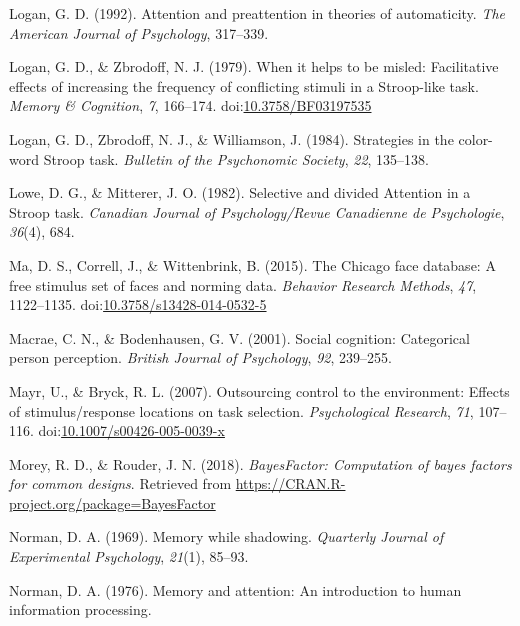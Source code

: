 \documentclass[english,,man,floatsintext]{apa6}
\begin{document}
\leavevmode\hypertarget{ref-logan_attention_1992}{}%
Logan, G. D. (1992). Attention and preattention in theories of automaticity. \emph{The American Journal of Psychology}, 317--339.

\leavevmode\hypertarget{ref-logan_when_1979}{}%
Logan, G. D., \& Zbrodoff, N. J. (1979). When it helps to be misled: Facilitative effects of increasing the frequency of conflicting stimuli in a Stroop-like task. \emph{Memory \& Cognition}, \emph{7}, 166--174. doi:\href{https://doi.org/10.3758/BF03197535}{10.3758/BF03197535}

\leavevmode\hypertarget{ref-logan_strategies_1984}{}%
Logan, G. D., Zbrodoff, N. J., \& Williamson, J. (1984). Strategies in the color-word Stroop task. \emph{Bulletin of the Psychonomic Society}, \emph{22}, 135--138.

\leavevmode\hypertarget{ref-lowe_selective_1982}{}%
Lowe, D. G., \& Mitterer, J. O. (1982). Selective and divided Attention in a Stroop task. \emph{Canadian Journal of Psychology/Revue Canadienne de Psychologie}, \emph{36}(4), 684.

\leavevmode\hypertarget{ref-ma_chicago_2015}{}%
Ma, D. S., Correll, J., \& Wittenbrink, B. (2015). The Chicago face database: A free stimulus set of faces and norming data. \emph{Behavior Research Methods}, \emph{47}, 1122--1135. doi:\href{https://doi.org/10.3758/s13428-014-0532-5}{10.3758/s13428-014-0532-5}

\leavevmode\hypertarget{ref-macrae_social_2001}{}%
Macrae, C. N., \& Bodenhausen, G. V. (2001). Social cognition: Categorical person perception. \emph{British Journal of Psychology}, \emph{92}, 239--255.

\leavevmode\hypertarget{ref-mayr_outsourcing_2007}{}%
Mayr, U., \& Bryck, R. L. (2007). Outsourcing control to the environment: Effects of stimulus/response locations on task selection. \emph{Psychological Research}, \emph{71}, 107--116. doi:\href{https://doi.org/10.1007/s00426-005-0039-x}{10.1007/s00426-005-0039-x}

\leavevmode\hypertarget{ref-r_bayesfactor_2018}{}%
Morey, R. D., \& Rouder, J. N. (2018). \emph{BayesFactor: Computation of bayes factors for common designs}. Retrieved from \url{https://CRAN.R-project.org/package=BayesFactor}

\leavevmode\hypertarget{ref-norman_memory_1969}{}%
Norman, D. A. (1969). Memory while shadowing. \emph{Quarterly Journal of Experimental Psychology}, \emph{21}(1), 85--93.

\leavevmode\hypertarget{ref-norman_memory_1976}{}%
Norman, D. A. (1976). Memory and attention: An introduction to human information processing.
\end{document}
